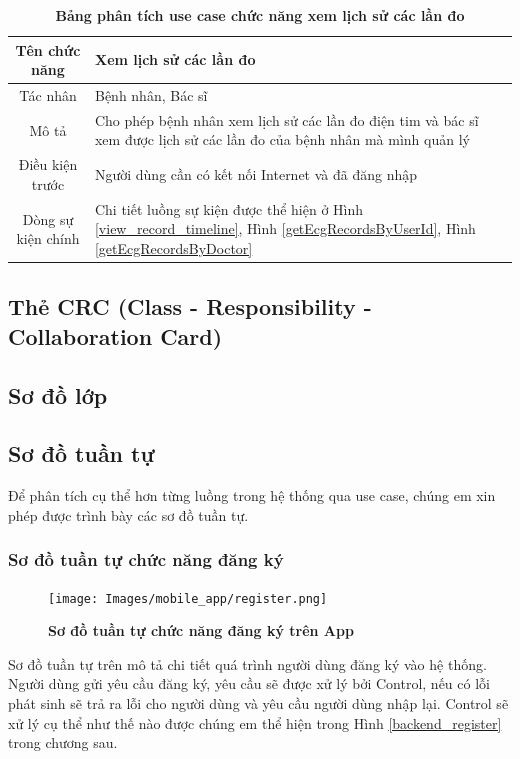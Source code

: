   \begin{table}[H]
    \caption{\bfseries \fontsize{12pt}{0pt}\selectfont Bảng phân tích use case chức năng xem lịch sử các lần đo}
    \centering
    \begin{tabularx}{0.9\textwidth}{|c|X|}
      \hline
      \textbf{Tên chức năng} & \textbf{Xem lịch sử các lần đo} \\
      \hline
      Tác nhân & Bệnh nhân, Bác sĩ \\
      \hline
      Mô tả & Cho phép bệnh nhân xem lịch sử các lần đo điện tim và bác sĩ xem được lịch sử các lần đo của bệnh nhân
      mà mình quản lý \\
      \hline
      Điều kiện trước & Người dùng cần có kết nối Internet và đã đăng nhập \\
      \hline
      Dòng sự kiện chính & 
        Chi tiết luồng sự kiện được thể hiện ở Hình \ref{view_record_timeline}, Hình \ref{getEcgRecordsByUserId}, Hình \ref{getEcgRecordsByDoctor} 
        \\
      \hline
    \end{tabularx}
  \end{table}
\subsection{Thẻ CRC (Class - Responsibility - Collaboration Card)}

\subsection{Sơ đồ lớp}

\subsection{Sơ đồ tuần tự}
Để phân tích cụ thể hơn từng luồng trong hệ thống qua use case, chúng em xin phép được trình bày các sơ đồ tuần
tự. 
\subsubsection{Sơ đồ tuần tự chức năng đăng ký}
  \begin{figure}[H]
        \centering
        \texttt{[image: Images/mobile\_app/register.png]}
        \caption[Sơ đồ tuần tự chức năng đăng ký trên App]{\bfseries \fontsize{12pt}{0pt}
        \selectfont Sơ đồ tuần tự chức năng đăng ký trên App}
        \label{register} %
  \end{figure}
  Sơ đồ tuần tự trên mô tả chi tiết quá trình người dùng đăng ký vào hệ thống. Người dùng gửi yêu cầu đăng ký, yêu cầu sẽ
  được xử lý bởi Control, nếu có lỗi phát sinh sẽ trả ra lỗi cho người dùng và yêu cầu người dùng nhập lại. Control
  sẽ xử lý cụ thể như thế nào được chúng em thể hiện trong Hình \ref{backend_register} trong chương sau.
